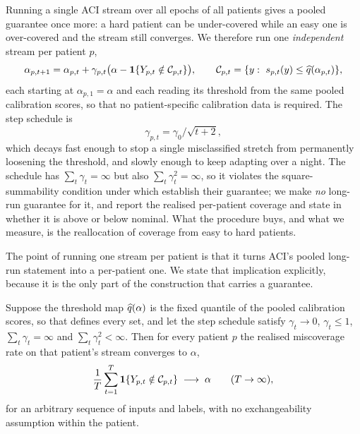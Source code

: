 Running a single ACI stream over all epochs of all patients gives a pooled
guarantee once more: a hard patient can be under-covered while an easy one is
over-covered and the stream still converges. We therefore run one
\emph{independent} stream per patient $p$,
\begin{equation}
\alpha_{p,t+1}=\alpha_{p,t}+\gamma_{p,t}\big(\alpha-\mathbf{1}\{Y_{p,t}\notin\mathcal{C}_{p,t}\}\big),
\qquad
\mathcal{C}_{p,t}=\{y:\ s_{p,t}(y)\le\widehat{q}(\alpha_{p,t})\},
\label{eq:aci-patient}
\end{equation}
each starting at $\alpha_{p,1}=\alpha$ and each reading its threshold from the
same pooled calibration scores, so that no patient-specific calibration data
is required. The step schedule is
\begin{equation}
\gamma_{p,t}=\gamma_0/\sqrt{t+2},
\label{eq:step}
\end{equation}
which decays fast enough to stop a single misclassified stretch from
permanently loosening the threshold, and slowly enough to keep adapting over a
night. The schedule has $\sum_t\gamma_t=\infty$ but also
$\sum_t\gamma_t^2=\infty$, so it violates the square-summability condition
under which \citet{angelopoulos2024} establish their guarantee; we make
\emph{no} long-run guarantee for it, and report
the realised per-patient coverage and state in 
whether it is above or below nominal. What the procedure buys, and what we
measure, is the reallocation of coverage from easy to hard patients.

The point of running one stream per patient is that it turns ACI's pooled
long-run statement into a per-patient one. We state that implication
explicitly, because it is the only part of the construction that carries a
guarantee.

\begin{corollary}
\label{cor:per-patient}
Suppose the threshold map $\widehat{q}(\alpha)$ is the fixed quantile of the pooled
calibration scores, so that  defines every set, and let
the step schedule satisfy $\gamma_t\to0$, $\gamma_t\le1$,
$\sum_t\gamma_t=\infty$ and $\sum_t\gamma_t^2<\infty$. Then for every patient
$p$ the realised miscoverage rate on that patient's stream converges to
$\alpha$,
\begin{equation}
\frac{1}{T}\sum_{t=1}^{T}\mathbf{1}\{Y_{p,t}\notin\mathcal{C}_{p,t}\}
\;\longrightarrow\;\alpha
\qquad (T\to\infty),
\label{eq:aci-per-patient}
\end{equation}
for an arbitrary sequence of inputs and labels, with no exchangeability
assumption within the patient.
\end{corollary}


